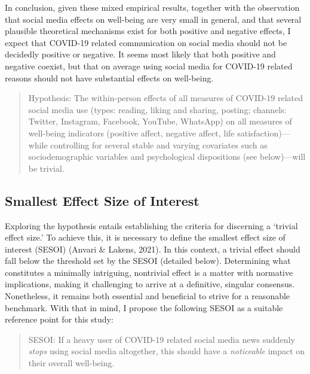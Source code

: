 \documentclass[
  man,mask,floatsintext]{apa7}
\begin{document}
In conclusion, given these mixed empirical results, together with the observation that social media effects on well-being are very small in general, and that several plausible theoretical mechanisms exist for both positive and negative effects, I expect that COVID-19 related communication on social media should not be decidedly positive or negative.
It seems most likely that both positive and negative coexist, but that on average using social media for COVID-19 related reasons should not have substantial effects on well-being.

\begin{quote}
Hypothesis: The within-person effects of all measures of COVID-19 related social media use (types: reading, liking and sharing, posting; channels: Twitter, Instagram, Facebook, YouTube, WhatsApp) on all measures of well-being indicators (positive affect, negative affect, life satisfaction)---while controlling for several stable and varying covariates such as sociodemographic variables and psychological dispositions (see below)---will be trivial.
\end{quote}

\hypertarget{smallest-effect-size-of-interest}{%
\subsection{Smallest Effect Size of Interest}\label{smallest-effect-size-of-interest}}

Exploring the hypothesis entails establishing the criteria for discerning a `trivial effect size.'
To achieve this, it is necessary to define the smallest effect size of interest (SESOI) (Anvari \& Lakens, 2021).
In this context, a trivial effect should fall below the threshold set by the SESOI (detailed below).
Determining what constitutes a minimally intriguing, nontrivial effect is a matter with normative implications, making it challenging to arrive at a definitive, singular consensus.
Nonetheless, it remains both essential and beneficial to strive for a reasonable benchmark.
With that in mind, I propose the following SESOI as a suitable reference point for this study:

\begin{quote}
SESOI: If a heavy user of COVID-19 related social media news suddenly \emph{stops} using social media altogether, this should have a \emph{noticeable} impact on their overall well-being.
\end{quote}
\end{document}
